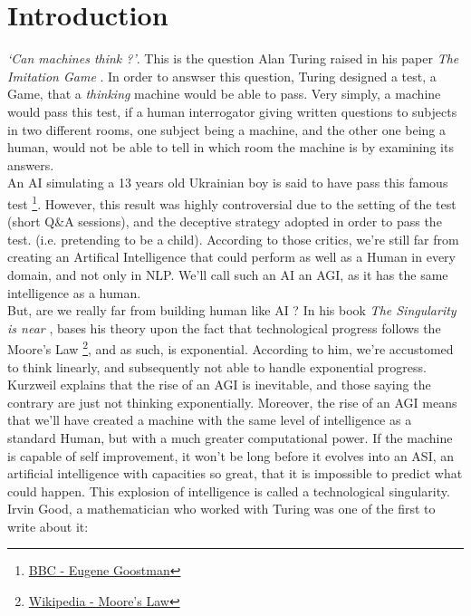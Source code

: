 \documentclass[12pt]{article}
\begin{document}
\section*{Introduction}\label{introduction}

\smallskip

{\em \lq Can machines think ?\rq }. This is the question Alan Turing raised in
his paper {\em The Imitation Game} \cite{Turing}. In order to answser this
question, Turing designed a test, a Game, that a {\em thinking} machine would
be able to pass. Very simply, a machine would pass this test, if a human
interrogator giving written questions to subjects in two different rooms,
one subject being a machine, and the other one being a human, would not be able
to tell in which room the machine is by examining its answers.
\\

An AI simulating a 13 years old Ukrainian boy is said to have pass this famous
test \footnote{\href{http://www.bbc.com/news/technology-27762088}
{BBC - Eugene Goostman}}. However, this result was highly controversial due to
the setting of the test (short Q\&A sessions), and the deceptive strategy adopted
in order to pass the test. (i.e. pretending to be a child). According to those
critics, we're still far from creating an Artifical Intelligence that could
perform as well as a Human in every domain, and not only in \gls{NLP}.
We'll call such an AI an \gls{AGI}, as it has the same intelligence as a human.
\\

But, are we really far from building human like AI ? In his book
{\em The Singularity is near} \cite{Kurzweil}, bases his theory upon the fact
that technological progress follows the Moore's Law
\footnote{\href{https://en.wikipedia.org/wiki/Moore\%27s_law}
{Wikipedia - Moore's Law} }, and as such, is exponential. According to him, we're
accustomed to think linearly, and subsequently not able to handle exponential
progress. Kurzweil explains that the rise of an \gls{AGI} is inevitable, and
those saying the contrary are just not thinking exponentially. Moreover, the
rise of an \gls{AGI} means that we'll have created a machine with the same level
of intelligence as a standard Human, but with a much greater computational power.
If the machine is capable of self improvement, it won't be long before it
evolves into an \gls{ASI}, an artificial intelligence with capacities so great,
that it is impossible to predict what could happen. This explosion of intelligence
is called a technological singularity. Irvin Good, a mathematician who worked
with Turing was one of the first to write about it:
\\
\end{document}
